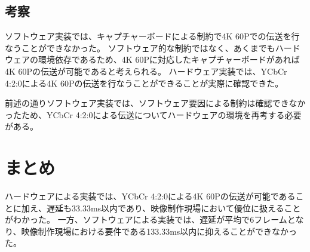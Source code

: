 \subsection{考察}
ソフトウェア実装では、キャプチャーボードによる制約で4K 60Pでの伝送を行なうことができなかった。
ソフトウェア的な制約ではなく、あくまでもハードウェアの環境依存であるため、4K 60Pに対応したキャプチャーボードがあれば4K 60Pの伝送が可能であると考えられる。
ハードウェア実装では、YCbCr 4:2:0による4K 60Pの伝送を行なうことができることが実際に確認できた。

前述の通りソフトウェア実装では、ソフトウェア要因による制約は確認できなかったため、YCbCr 4:2:0による伝送についてハードウェアの環境を再考する必要がある。


\section{まとめ}

ハードウェアによる実装では、YCbCr 4:2:0による4K 60Pの伝送が可能であることに加え、遅延も33.33ms以内であり、映像制作現場において優位に扱えることがわかった。
一方、ソフトウェアによる実装では、遅延が平均で6フレームとなり、映像制作現場における要件である133.33ms以内に抑えることができなかった。
